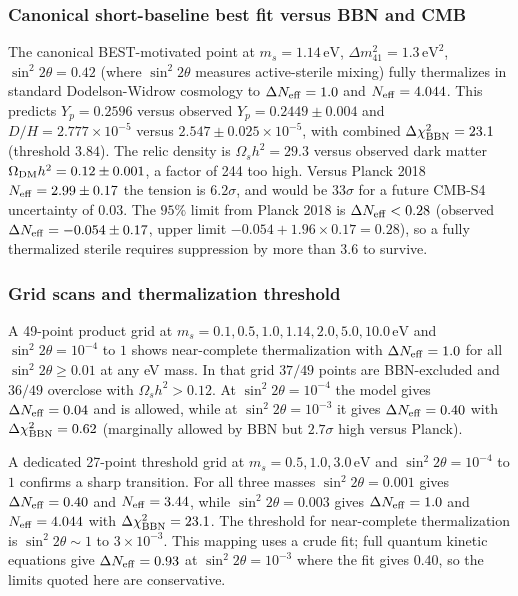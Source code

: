 \documentclass[11pt,a4paper]{article}
\begin{document}
\subsubsection{Canonical short-baseline best fit versus BBN and CMB}
The canonical BEST-motivated point at $m_s = 1.14\,\mathrm{eV}$, $\Delta m^2_{41} = 1.3\,\mathrm{eV}^2$, $\sin^2 2\theta = 0.42$ (where $\sin^2 2\theta$ measures active-sterile mixing) fully thermalizes in standard Dodelson-Widrow cosmology to $\Delta N_{\rm eff} = 1.0$ and $N_{\rm eff} = 4.044$. This predicts $Y_p = 0.2596$ versus observed $Y_p = 0.2449 \pm 0.004$ and $D/H = 2.777 \times 10^{-5}$ versus $2.547 \pm 0.025 \times 10^{-5}$, with combined $\Delta\chi^2_{\rm BBN} = 23.1$ (threshold $3.84$). The relic density is $\Omega_s h^2 = 29.3$ versus observed dark matter $\Omega_{\rm DM} h^2 = 0.12 \pm 0.001$, a factor of 244 too high. Versus Planck 2018 $N_{\rm eff} = 2.99 \pm 0.17$ the tension is $6.2\sigma$, and would be $33\sigma$ for a future CMB-S4 uncertainty of $0.03$. The $95\%$ limit from Planck 2018 is $\Delta N_{\rm eff} < 0.28$ (observed $\Delta N_{\rm eff} = -0.054 \pm 0.17$, upper limit $-0.054 + 1.96 \times 0.17 = 0.28$), so a fully thermalized sterile requires suppression by more than $3.6$ to survive.

\subsubsection{Grid scans and thermalization threshold}
A 49-point product grid at $m_s = 0.1, 0.5, 1.0, 1.14, 2.0, 5.0, 10.0\,\mathrm{eV}$ and $\sin^2 2\theta = 10^{-4}$ to $1$ shows near-complete thermalization with $\Delta N_{\rm eff} = 1.0$ for all $\sin^2 2\theta \ge 0.01$ at any eV mass. In that grid $37/49$ points are BBN-excluded and $36/49$ overclose with $\Omega_s h^2 > 0.12$. At $\sin^2 2\theta = 10^{-4}$ the model gives $\Delta N_{\rm eff} = 0.04$ and is allowed, while at $\sin^2 2\theta = 10^{-3}$ it gives $\Delta N_{\rm eff} = 0.40$ with $\Delta\chi^2_{\rm BBN} = 0.62$ (marginally allowed by BBN but $2.7\sigma$ high versus Planck).

A dedicated 27-point threshold grid at $m_s = 0.5, 1.0, 3.0\,\mathrm{eV}$ and $\sin^2 2\theta = 10^{-4}$ to $1$ confirms a sharp transition. For all three masses $\sin^2 2\theta = 0.001$ gives $\Delta N_{\rm eff} = 0.40$ and $N_{\rm eff} = 3.44$, while $\sin^2 2\theta = 0.003$ gives $\Delta N_{\rm eff} = 1.0$ and $N_{\rm eff} = 4.044$ with $\Delta\chi^2_{\rm BBN} = 23.1$. The threshold for near-complete thermalization is $\sin^2 2\theta \sim 1$ to $3 \times 10^{-3}$. This mapping uses a crude fit; full quantum kinetic equations give $\Delta N_{\rm eff} = 0.93$ at $\sin^2 2\theta = 10^{-3}$ where the fit gives $0.40$, so the limits quoted here are conservative.
\end{document}
